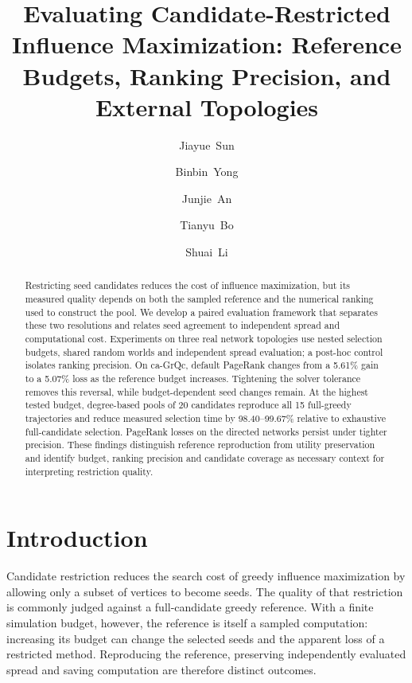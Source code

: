 \documentclass[smallextended]{svjour3}
\begin{document}
\title{Evaluating Candidate-Restricted Influence Maximization: Reference Budgets, Ranking Precision, and External Topologies}
\author{\mbox{Jiayue Sun} \and \mbox{Binbin Yong} \and \mbox{Junjie An} \and \mbox{Tianyu Bo} \and \mbox{Shuai Li}}
\date{}
\maketitle
\begin{abstract}
Restricting seed candidates reduces the cost of influence maximization, but its measured quality depends on both the sampled reference and the numerical ranking used to construct the pool. We develop a paired evaluation framework that separates these two resolutions and relates seed agreement to independent spread and computational cost. Experiments on three real network topologies use nested selection budgets, shared random worlds and independent spread evaluation; a post-hoc control isolates ranking precision. On ca-GrQc, default PageRank changes from a 5.61\% gain to a 5.07\% loss as the reference budget increases. Tightening the solver tolerance removes this reversal, while budget-dependent seed changes remain. At the highest tested budget, degree-based pools of 20 candidates reproduce all 15 full-greedy trajectories and reduce measured selection time by 98.40--99.67\% relative to exhaustive full-candidate selection. PageRank losses on the directed networks persist under tighter precision. These findings distinguish reference reproduction from utility preservation and identify budget, ranking precision and candidate coverage as necessary context for interpreting restriction quality.
\end{abstract}

\section{Introduction}
Candidate restriction reduces the search cost of greedy influence maximization by allowing only a subset of vertices to become seeds. The quality of that restriction is commonly judged against a full-candidate greedy reference. With a finite simulation budget, however, the reference is itself a sampled computation: increasing its budget can change the selected seeds and the apparent loss of a restricted method. Reproducing the reference, preserving independently evaluated spread and saving computation are therefore distinct outcomes.
\end{document}

